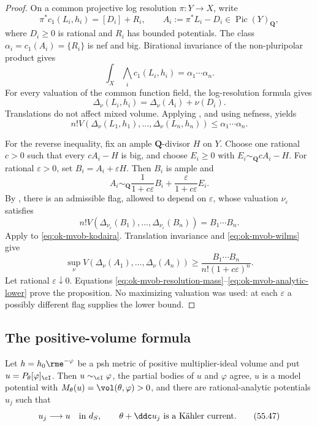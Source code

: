 \begin{proof}
On a common projective log resolution \(\pi:Y\to X\), write
\[
 \pi^*c_1(L_i,h_i)=[D_i]+R_i,\qquad
 A_i:=\pi^*L_i-D_i\in\operatorname{Pic}(Y)_{\mathbf Q},
\]
where \(D_i\geq0\) is rational and \(R_i\) has bounded potentials.  The
class \(\alpha_i=c_1(A_i)=\{R_i\}\) is nef and big.  Birational invariance
of the non-pluripolar product gives
\[
 \int_X\bigwedge_i c_1(L_i,h_i)=\alpha_1\cdots\alpha_n.
\tag{55.41}\label{eq:ok-mvob-resolution-mass}
\]
For every valuation of the common function field, the log-resolution
formula \cite[Remark~10.3.1, equation~(10.22)]{XiaBook} gives
\[
 \Delta_\nu(L_i,h_i)=\Delta_\nu(A_i)+\nu(D_i).
\tag{55.42}\label{eq:ok-mvob-resolution-body}
\]
Translations do not affect mixed volume.  Applying
, and using nefness, yields
\[
 n!V(\Delta_\nu(L_1,h_1),\ldots,\Delta_\nu(L_n,h_n))
 \leq\alpha_1\cdots\alpha_n.
\tag{55.43}\label{eq:ok-mvob-analytic-upper}
\]

For the reverse inequality, fix an ample \(\mathbf Q\)-divisor \(H\) on
\(Y\).  Choose one rational \(c>0\) such that every \(cA_i-H\) is big, and
choose \(E_i\geq0\) with \(E_i\sim_{\mathbf Q}cA_i-H\).  For rational
\(\varepsilon>0\), set \(B_i=A_i+\varepsilon H\).  Then \(B_i\) is ample
and
\[
 A_i\sim_{\mathbf Q}
 \frac1{1+c\varepsilon}B_i
 +\frac{\varepsilon}{1+c\varepsilon}E_i.
\tag{55.44}\label{eq:ok-mvob-kodaira}
\]
By \cite[Theorem~1.1]{Wil25}, there is an admissible flag, allowed to depend
on \(\varepsilon\), whose valuation \(\nu_\varepsilon\) satisfies
\[
 n!V(\Delta_{\nu_\varepsilon}(B_1),\ldots,
      \Delta_{\nu_\varepsilon}(B_n))=B_1\cdots B_n.
\tag{55.45}\label{eq:ok-mvob-wilms}
\]
Apply  to
\eqref{eq:ok-mvob-kodaira}.  Translation invariance and
\eqref{eq:ok-mvob-wilms} give
\[
 \sup_\nu V(\Delta_\nu(A_1),\ldots,\Delta_\nu(A_n))
 \geq\frac{B_1\cdots B_n}{n!(1+c\varepsilon)^n}.
\tag{55.46}\label{eq:ok-mvob-analytic-lower}
\]
Let rational \(\varepsilon\downarrow0\).  Equations
\eqref{eq:ok-mvob-resolution-mass}--\eqref{eq:ok-mvob-analytic-lower}
prove the proposition.  No maximizing valuation was used: at each
\(\varepsilon\) a possibly different flag supplies the lower bound.
\end{proof}

\subsection{The positive-volume formula}

\begin{lemma}\label{lem:ok-mvob-i-model-approximation}
Let \(h=h_0\rme^{-\varphi}\) be a psh metric of positive
multiplier-ideal volume and put \(u=P_\theta[\varphi]_{\cI}\).  Then
\(u\sim_{\cI}\varphi\), the partial bodies of \(u\) and \(\varphi\) agree,
\(u\) is a model potential with
\(M_\theta(u)=\vol(\theta,\varphi)>0\), and there are rational-analytic
potentials \(u_j\) such that
\[
 u_j\longrightarrow u\quad\text{in }d_S,\qquad
 \theta+\ddc u_j\ \text{is a K\"ahler current}.
\tag{55.47}\label{eq:ok-mvob-approximating}
\]
\end{lemma}

